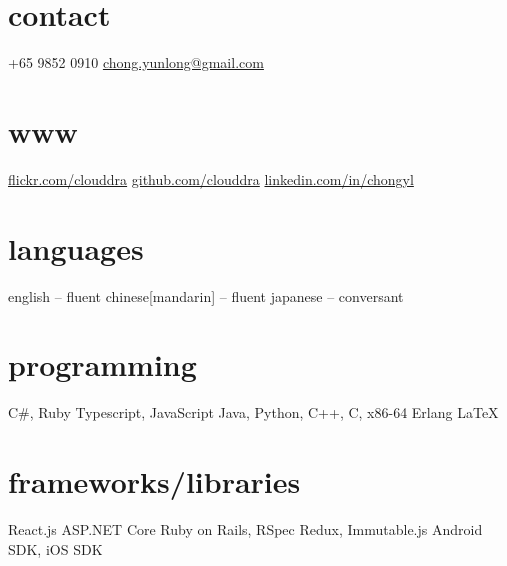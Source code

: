 \documentclass[]{cv} %
\begin{document}


\begin{aside} %
\section{contact}
+65 9852 0910
\href{mailto:chong.yunlong@gmail.com}{chong.yunlong@gmail.com}
~
\section{www}
\href{https://secure.flickr.com/photos/clouddra/}{flickr.com/clouddra}
\href{https://github.com/clouddra}{github.com/clouddra}
\href{https://sg.linkedin.com/in/chongyl}{linkedin.com/in/chongyl}
~
\section{languages}
english -- fluent
chinese[mandarin] -- fluent
japanese -- conversant
~
\section{programming}
C\#, Ruby
Typescript, JavaScript
Java, Python, 
C++, C, x86-64
Erlang
\LaTeX{}
~
\section{frameworks/libraries}
React.js
ASP.NET Core
Ruby on Rails, RSpec
Redux, Immutable.js
Android SDK, iOS SDK
~
\end{aside}

\end{document}
